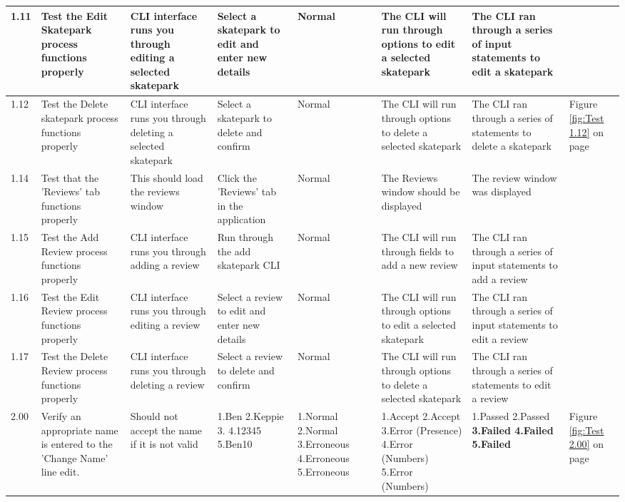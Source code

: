 \begin{landscape}
\begin{center}
\begin{longtable}{|p{1.5cm}|p{2.5cm}|p{2.5cm}|p{2cm}|p{2cm}|p{2cm}|p{2cm}|p{2cm}|}
1.11 & Test the Edit Skatepark process functions properly & CLI interface runs you through editing a selected skatepark & Select a skatepark to edit and enter new details & Normal & The CLI will run through options to edit a selected skatepark & The CLI ran through a series of input statements to edit a skatepark  & \\ \hline

1.12 &  Test the Delete skatepark process functions properly & CLI interface runs you through deleting a selected skatepark & Select a skatepark to delete and confirm & Normal & The CLI will run through options to delete a selected skatepark & The CLI ran through a series of statements to delete a skatepark & Figure \ref{fig:Test 1.12} on page \pageref{fig:Test 1.12}\\ \hline

1.14 & Test that the 'Reviews' tab functions properly & This should load the reviews window & Click the 'Reviews' tab in the application & Normal & The Reviews window should be displayed & The review window was displayed &  \\ \hline

1.15 & Test the Add Review process functions properly &   CLI interface runs you through adding a review & Run through the add skatepark CLI & Normal & The CLI will run through fields to add a new review & The CLI ran through a series of input statements to add a review &  \\ \hline

1.16 & Test the Edit Review process functions properly & CLI interface runs you through editing a review &  Select a review to edit and enter new details & Normal & The CLI will run through options to edit a selected skatepark & The CLI ran through a series of input statements to edit a review  & \\ \hline

1.17  & Test the Delete Review process functions properly &  CLI interface runs you through deleting a review &  Select a review to delete and confirm & Normal & The CLI will run through options to delete a selected skatepark & The CLI ran through a series of statements to edit a review &  \\ \hline



2.00 & Verify an appropriate name is entered to the 'Change Name' line edit. & Should not accept the name if it is not valid & 1.Ben 2.Keppie 3.   4.12345  5.Ben10 & 1.Normal 2.Normal 3.Erroneous 4.Erroneous 5.Erroneous & 1.Accept 2.Accept 3.Error (Presence) 4.Error (Numbers) 5.Error (Numbers) & 1.Passed 2.Passed \textbf{3.Failed 4.Failed 5.Failed} &Figure \ref{fig:Test 2.00} on page \pageref{fig:Test 2.00} \\ \hline


\end{longtable}
\end{center}
\end{landscape}
